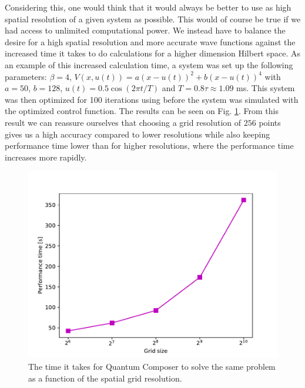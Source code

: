 \documentclass[a4paper, twocolumn]{revtex4-1}
\begin{document}
Considering this, one would think that it would always be better to use as high spatial resolution of a given system as possible. This would of course be true if we had access to unlimited computational power. We instead have to balance the desire for a high spatial resolution and more accurate wave functions against the increased time it takes to do calculations for a higher dimension Hilbert space. As an example of this increased calculation time, a system was set up the following parameters: $\beta = 4$, $V(x,u(t)) = a(x-u(t))^2 + b(x-u(t))^4$ with $a=50$, $b=128$, $u(t)=0.5 \cos(2\pi t/T)$ and $T=0.8 \tau \approx 1.09$ ms. This system was then optimized for 100 iterations using  before the system was simulated with the optimized control function. The results can be seen on Fig. \ref{fig:performanceTime}. From this result we can reassure ourselves that choosing a grid resolution of $256$ points gives us a high accuracy compared to lower resolutions while also keeping performance time lower than for higher resolutions, where the performance time increases more rapidly.

\begin{figure}
	\includegraphics[width=\columnwidth]{graphics/stateAnalysis/PerformanceTime.pdf}
	\caption{The time it takes for Quantum Composer to solve the same problem as a function of the spatial grid resolution.}
	\label{fig:performanceTime}
\end{figure}

\end{document}
